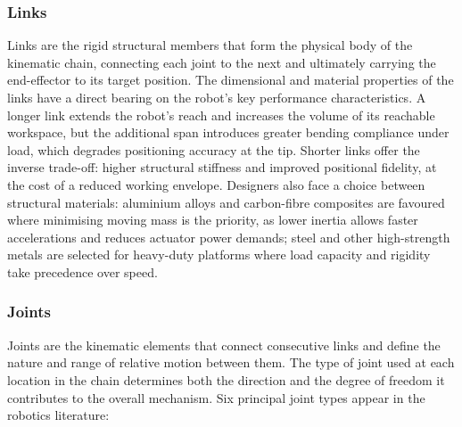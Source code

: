 \subsubsection{Links}
\hspace{1.27cm}
Links are the rigid structural members that form the physical body of
the kinematic chain, connecting each joint to the next and ultimately
carrying the end-effector to its target position. The dimensional
and material properties of the links have a direct bearing on the
robot's key performance characteristics. A longer link extends the
robot's reach and increases the volume of its reachable workspace,
but the additional span introduces greater bending compliance under
load, which degrades positioning accuracy at the tip. Shorter links
offer the inverse trade-off: higher structural stiffness and improved
positional fidelity, at the cost of a reduced working envelope.
Designers also face a choice between structural materials: aluminium
alloys and carbon-fibre composites are favoured where minimising
moving mass is the priority, as lower inertia allows faster
accelerations and reduces actuator power demands; steel and other
high-strength metals are selected for heavy-duty platforms where load
capacity and rigidity take precedence over speed.

\subsubsection{Joints}
\hspace{1.27cm}
Joints are the kinematic elements that connect consecutive links and
define the nature and range of relative motion between them. The
type of joint used at each location in the chain determines both the
direction and the degree of freedom it contributes to the overall
mechanism. Six principal joint types appear in the robotics literature:

